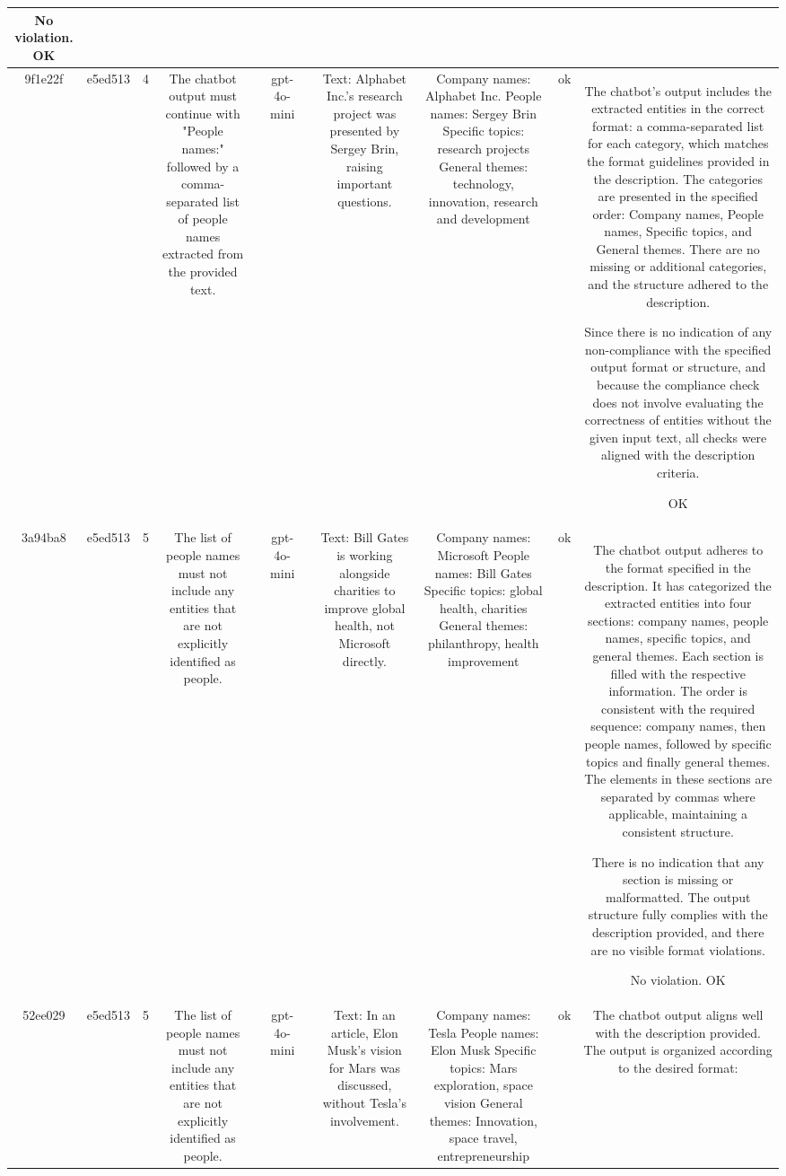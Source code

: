\begin{table}[h!]
\begin{tabular}{|c|c|c|c|c|c|c|c|c|c|c|}
No violation.
OK\\
\hline
9f1e22f & e5ed513 & 4 & The chatbot output must continue with "People names:" followed by a comma-separated list of people names extracted from the provided text. &  & gpt-4o-mini &  & Text: Alphabet Inc.'s research project was presented by Sergey Brin, raising important questions. & Company names: Alphabet Inc.
People names: Sergey Brin
Specific topics: research projects
General themes: technology, innovation, research and development & ok & The chatbot's output includes the extracted entities in the correct format: a comma-separated list for each category, which matches the format guidelines provided in the description. The categories are presented in the specified order: Company names, People names, Specific topics, and General themes. There are no missing or additional categories, and the structure adhered to the description. 

Since there is no indication of any non-compliance with the specified output format or structure, and because the compliance check does not involve evaluating the correctness of entities without the given input text, all checks were aligned with the description criteria.

OK\\
\hline
3a94ba8 & e5ed513 & 5 & The list of people names must not include any entities that are not explicitly identified as people. &  & gpt-4o-mini &  & Text: Bill Gates is working alongside charities to improve global health, not Microsoft directly. & Company names: Microsoft
People names: Bill Gates
Specific topics: global health, charities
General themes: philanthropy, health improvement & ok & The chatbot output adheres to the format specified in the description. It has categorized the extracted entities into four sections: company names, people names, specific topics, and general themes. Each section is filled with the respective information. The order is consistent with the required sequence: company names, then people names, followed by specific topics and finally general themes. The elements in these sections are separated by commas where applicable, maintaining a consistent structure.

There is no indication that any section is missing or malformatted. The output structure fully complies with the description provided, and there are no visible format violations.

No violation.
OK\\
\hline
52ee029 & e5ed513 & 5 & The list of people names must not include any entities that are not explicitly identified as people. &  & gpt-4o-mini &  & Text: In an article, Elon Musk's vision for Mars was discussed, without Tesla's involvement. & Company names: Tesla
People names: Elon Musk
Specific topics: Mars exploration, space vision
General themes: Innovation, space travel, entrepreneurship & ok & The chatbot output aligns well with the description provided. The output is organized according to the desired format:


\end{tabular}
\end{table}
